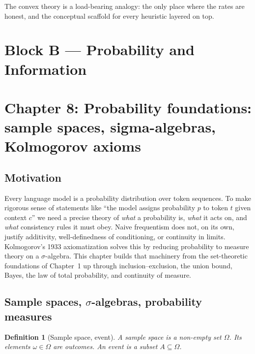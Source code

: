 \documentclass[11pt]{article}
\newtheorem{definition}[theorem]{Definition}
\theoremstyle{remark}
\begin{document}
The convex theory is a load-bearing analogy: the only place where the rates are honest, and the conceptual scaffold for every heuristic layered on top.



\section*{Block B --- Probability and Information}

\section*{Chapter 8: Probability foundations: sample spaces, sigma-algebras, Kolmogorov axioms}

\subsection*{Motivation}

Every language model is a probability distribution over token sequences. To make rigorous sense of statements like ``the model assigns probability $p$ to token $t$ given context $c$'' we need a precise theory of \emph{what} a probability is, \emph{what} it acts on, and \emph{what} consistency rules it must obey. Naive frequentism does not, on its own, justify additivity, well-definedness of conditioning, or continuity in limits. Kolmogorov's 1933 axiomatization solves this by reducing probability to measure theory on a $\sigma$-algebra. This chapter builds that machinery from the set-theoretic foundations of Chapter~1 up through inclusion--exclusion, the union bound, Bayes, the law of total probability, and continuity of measure.

\subsection*{Sample spaces, $\sigma$-algebras, probability measures}

\begin{definition}[Sample space, event]
A \emph{sample space} is a non-empty set $\Omega$. Its elements $\omega \in \Omega$ are \emph{outcomes}. An \emph{event} is a subset $A \subseteq \Omega$.
\end{definition}
\end{document}
